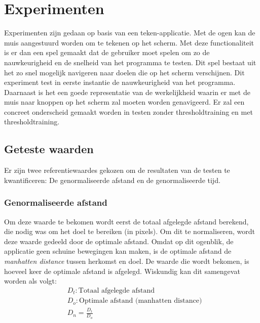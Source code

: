\documentclass{article}
\begin{document}
\section{Experimenten}
Experimenten zijn gedaan op basis van een teken-applicatie. Met de ogen kan de muis aangestuurd worden om te tekenen op het scherm. Met deze functionaliteit is er dan een spel gemaakt dat de gebruiker moet spelen om zo de nauwkeurigheid en de snelheid van het programma te testen. Dit spel bestaat uit het zo snel mogelijk navigeren naar doelen die op het scherm verschijnen. Dit experiment test in eerste instantie de nauwkeurigheid van het programma. Daarnaast is het een goede representatie van de werkelijkheid waarin er met de muis naar knoppen op het scherm zal moeten worden genavigeerd. Er zal een concreet onderscheid gemaakt worden in testen zonder thresholdtraining en met thresholdtraining.\\
\subsection{Geteste waarden}
Er zijn twee referentiewaardes gekozen om de resultaten van de testen te kwantificeren: De genormaliseerde afstand en de genormaliseerde tijd.

\subsubsection*{Genormaliseerde afstand}
Om deze waarde te bekomen wordt eerst de totaal afgelegde afstand berekend, die nodig was om het doel te bereiken (in pixels). Om dit te normaliseren, wordt deze waarde gedeeld door de optimale afstand. Omdat op dit ogenblik, de applicatie geen schuine bewegingen kan maken, is de optimale afstand de \textit{manhatten distance} \cite{manhdist} tussen herkomst en doel. De waarde die wordt bekomen, is hoeveel keer de optimale afstand is afgelegd. Wiskundig kan dit samengevat worden als volgt:
\begin{align*}
	&D_t: \text{Totaal afgelegde afstand}\\
	&D_o: \text{Optimale afstand (manhatten distance)}\\
	&D_n = \frac{D_t}{D_o}
\end{align*}
\end{document}
